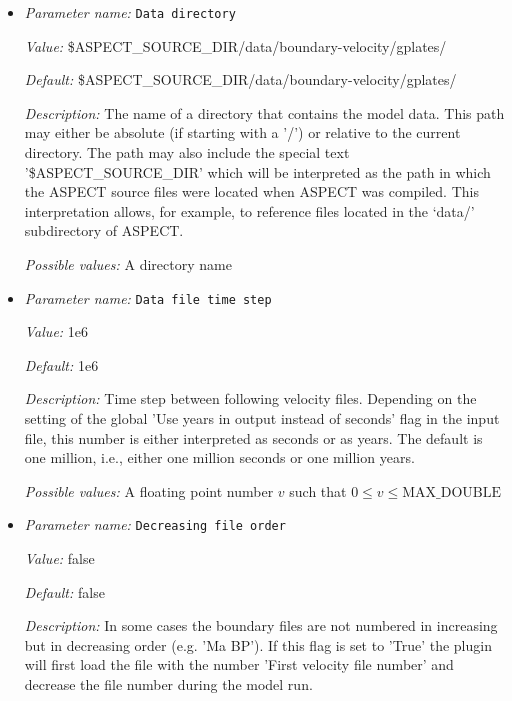\begin{itemize}
\item {\it Parameter name:} {\tt Data directory}
\label{parameters:Boundary velocity model/GPlates model/Data directory}


{\it Value:} \$ASPECT\_SOURCE\_DIR/data/boundary-velocity/gplates/


{\it Default:} \$ASPECT\_SOURCE\_DIR/data/boundary-velocity/gplates/


{\it Description:} The name of a directory that contains the model data. This path may either be absolute (if starting with a '/') or relative to the current directory. The path may also include the special text '\$ASPECT\_SOURCE\_DIR' which will be interpreted as the path in which the ASPECT source files were located when ASPECT was compiled. This interpretation allows, for example, to reference files located in the `data/' subdirectory of ASPECT. 


{\it Possible values:} A directory name
\item {\it Parameter name:} {\tt Data file time step}
\label{parameters:Boundary velocity model/GPlates model/Data file time step}


{\it Value:} 1e6


{\it Default:} 1e6


{\it Description:} Time step between following velocity files. Depending on the setting of the global 'Use years in output instead of seconds' flag in the input file, this number is either interpreted as seconds or as years. The default is one million, i.e., either one million seconds or one million years.


{\it Possible values:} A floating point number $v$ such that $0 \leq v \leq \text{MAX\_DOUBLE}$
\item {\it Parameter name:} {\tt Decreasing file order}
\label{parameters:Boundary velocity model/GPlates model/Decreasing file order}


{\it Value:} false


{\it Default:} false


{\it Description:} In some cases the boundary files are not numbered in increasing but in decreasing order (e.g. 'Ma BP'). If this flag is set to 'True' the plugin will first load the file with the number 'First velocity file number' and decrease the file number during the model run.



\end{itemize}
